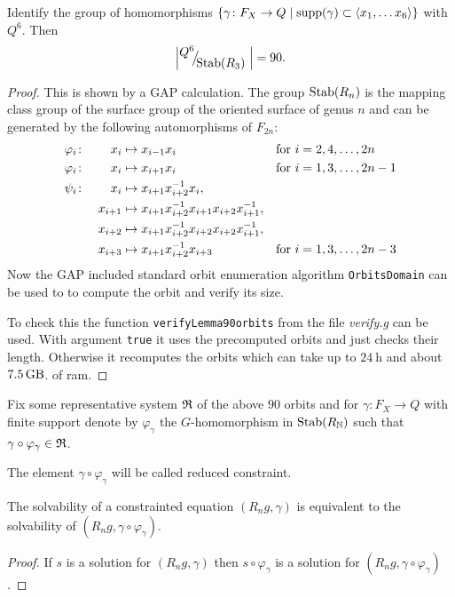 \documentclass[a4paper,12pt]{article}
\begin{document}
\begin{lem}
 Identify the group of homomorphisms $\{\gamma \colon F_X \to Q \mid \textup{supp}(\gamma) \subset \left<x_1,\ldots x_6\right>\}$ with $Q^6$. 
 Then \[\left|\RNK{Q^6}{\Stab(R_3)}\right|=90.\]
\end{lem}
\begin{proof}
 This is shown by a GAP calculation. The group $\textup{Stab}(R_n)$ is the mapping class group
 of the surface group of the oriented surface of genus $n$ and can be generated by the 
 following automorphisms of $F_{2n}$:
 \begin{align*}
  \varphi_i&\colon& x_i&\mapsto x_{i-1}x_i & \textup{for }&i=2,4,\ldots,2n \\
  \varphi_i&\colon&x_i&\mapsto x_{i+1}x_i & \textup{for }&i=1,3,\ldots,2n-1 \\
  \psi_i&\colon&x_i&\mapsto x_{i+1}x_{i+2}^{-1}x_i, && \\  
  &&x_{i+1}&\mapsto x_{i+1}x_{i+2}^{-1}x_{i+1}x_{i+2}x_{i+1}^{-1}, && \\  
  &&x_{i+2}&\mapsto x_{i+1}x_{i+2}^{-1}x_{i+2}x_{i+2}x_{i+1}^{-1}, && \\  
  &&x_{i+3}&\mapsto x_{i+1}x_{i+2}^{-1}x_{i+3}& \textup{for }&i=1,3,\ldots,2n-3   
 \end{align*}
 Now the GAP included standard orbit enumeration algorithm \lstinline{OrbitsDomain} can be used to 
 to compute the orbit and verify its size. 
 
 To check this the function \lstinline{verifyLemma90orbits} from the file \emph{verify.g} 
 can be used. With argument \lstinline{true} it uses the precomputed orbits and just checks
 their length. Otherwise it recomputes the orbits which can take up to $\SI{24}{\hour}$ 
 and about $\SI{7.5}{\giga\byte}$.
 of ram. 
\end{proof}
\begin{defi}
 Fix some representative system $\mathfrak{R}$ of the above $90$ orbits and for 
 $\gamma \colon F_X \to Q$ with finite support denote by $\varphi_\gamma$ the $G$-homomorphism in $\textup{Stab}(R_{\mathbb{N}})$ such that $\gamma\circ \varphi_\gamma \in \mathfrak{R}$.
 
 The element $\gamma \circ \varphi_\gamma$ will be called reduced constraint.
\end{defi}

\begin{lem}
 The solvability of a constrainted equation $(R_n g,\gamma)$ is equivalent to the solvability of $(R_n g,\gamma\circ \varphi_\gamma)$.
\end{lem}
 \begin{proof}
 If $s$ is a solution for $(R_n g,\gamma)$ then $s\circ \varphi_\gamma$ is
 a solution for $(R_n g,\gamma\circ \varphi_\gamma)$. 
\end{proof}
\end{document}
